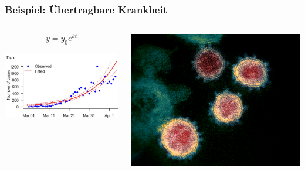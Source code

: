 \documentclass{beamer}
\begin{document}
\begin{frame}
\frametitle{Beispiel: Übertragbare Krankheit}

\begin{columns}[c]
\begin{column}{5cm}

\[
y = y_0 e^{kt}
\] 


\begin{center}

\includegraphics[width=\textwidth]{Covid19_Africa.png}
\end{center}



\end{column}
\begin{column}{5cm}

\begin{center}
\includegraphics[width=\textwidth]{SARS-CoV-2.jpg}
\end{center}


\end{column}
\end{columns}


\end{frame}
\end{document}
